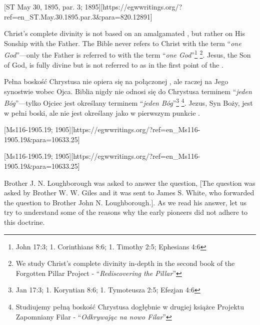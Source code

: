 [ST May 30, 1895, par. 3; 1895][https://egwwritings.org/?ref=en\_ST.May.30.1895.par.3&para=820.12891]


Christ's complete divinity is not based on an amalgamated , but rather on His Sonship with the Father. The Bible never refers to Christ with the term “\textit{one God}”—only the Father is referred to with the term “\textit{one God}”\footnote{John 17:3; 1. Corinthians 8:6; 1. Timothy 2:5; Ephesians 4:6} \footnote{We study Christ’s complete divinity in-depth  in the second book of the Forgotten Pillar Project - “\textit{Rediscovering the Pillar}”}. Jesus, the Son of God, is fully divine but is not referred to as  in the first point of the .


Pełna boskość Chrystusa nie opiera się na połączonej , ale raczej na Jego synostwie wobec Ojca. Biblia nigdy nie odnosi się do Chrystusa terminem “\textit{jeden Bóg}”—tylko Ojciec jest określany terminem “\textit{jeden Bóg}”\footnote{Jan 17:3; 1. Koryntian 8:6; 1. Tymoteusza 2:5; Efezjan 4:6} \footnote{Studiujemy pełną boskość Chrystusa dogłębnie w drugiej książce Projektu Zapomniany Filar - “\textit{Odkrywając na nowo Filar}”}. Jezus, Syn Boży, jest w pełni boski, ale nie jest określany jako  w pierwszym punkcie .


[Ms116-1905.19; 1905][https://egwwritings.org/?ref=en\_Ms116-1905.19&para=10633.25]


[Ms116-1905.19; 1905][https://egwwritings.org/?ref=en\_Ms116-1905.19&para=10633.25]


Brother J. N. Loughborough was asked to answer the question, [The question was asked by Brother W. W. Giles and it was sent to James S. White, who forwarded the question to Brother John N. Loughborough.]. As we read his answer, let us try to understand some of the reasons why the early pioneers did not adhere to this doctrine.


